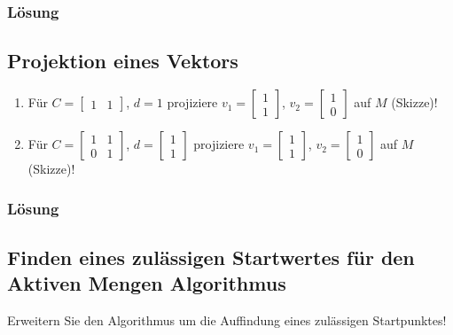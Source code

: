 \subsubsection{Lösung} 

\subsection*{Projektion eines Vektors}
\label{sec:uebung_proj_vektor} 
\begin{enumerate}[label=\alph*)]
  \item Für $C=\begin{bmatrix}1 & 1 \end{bmatrix}$, $d=1$ projiziere $v_1=\begin{bmatrix}1 \\ 1 \end{bmatrix}$, $v_2=\begin{bmatrix}1 \\ 0 \end{bmatrix}$ auf $M$ (Skizze)!
  \item Für $C=\begin{bmatrix}1 & 1\\ 0 & 1 \end{bmatrix}$, $d=\begin{bmatrix} 1\\1\end{bmatrix}$ projiziere $v_1=\begin{bmatrix}1 \\ 1 \end{bmatrix}$, $v_2=\begin{bmatrix}1 \\ 0
  \end{bmatrix}$ auf $M$ (Skizze)!
\end{enumerate}

\subsubsection{Lösung} 

\subsection*{Finden eines zulässigen Startwertes für den Aktiven Mengen Algorithmus}
\label{sec:uebung_finden_startwert} 
Erweitern Sie den Algorithmus um die Auffindung eines zulässigen Startpunktes!
 
